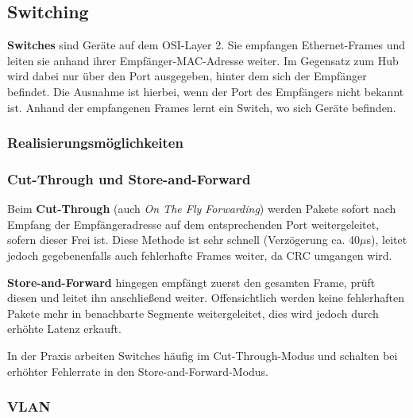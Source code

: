 \documentclass{article} %
\begin{document}
\subsection{Switching}

\textbf{Switches} sind Geräte auf dem OSI-Layer 2.
Sie empfangen Ethernet-Frames und leiten sie anhand ihrer Empfänger-MAC-Adresse weiter.
Im Gegensatz zum Hub wird dabei nur über den Port ausgegeben, hinter dem sich der Empfänger befindet.
Die Ausnahme ist hierbei, wenn der Port des Empfängers nicht bekannt ist.
Anhand der empfangenen Frames lernt ein Switch, wo sich Geräte befinden.

\subsubsection{Realisierungsmöglichkeiten}


\subsubsection{Cut-Through und Store-and-Forward}

Beim \textbf{Cut-Through} (auch \emph{On The Fly Forwarding}) werden Pakete sofort nach Empfang der Empfängeradresse auf dem entsprechenden Port weitergeleitet, sofern dieser Frei ist.
Diese Methode ist sehr schnell (Verzögerung ca. 40$\mu$s), leitet jedoch gegebenenfalls auch fehlerhafte Frames weiter, da CRC umgangen wird.

\textbf{Store-and-Forward} hingegen empfängt zuerst den gesamten Frame, prüft diesen und leitet ihn anschließend weiter.
Offensichtlich werden keine fehlerhaften Pakete mehr in benachbarte Segmente weitergeleitet, dies wird jedoch durch erhöhte Latenz erkauft.

In der Praxis arbeiten Switches häufig im Cut-Through-Modus und schalten bei erhöhter Fehlerrate in den Store-and-Forward-Modus.

\subsubsection{VLAN}
\end{document}
